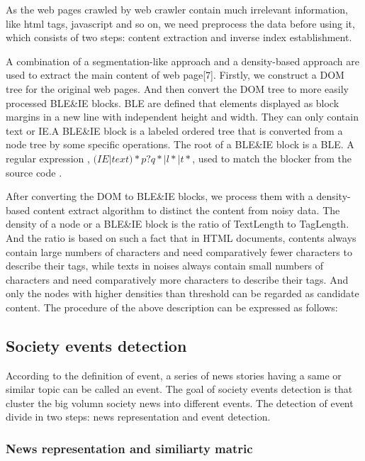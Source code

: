 \documentclass[conference]{IEEEtran}
\begin{document}
As the web pages crawled by web crawler contain much irrelevant information, like html tags, javascript and so on, we need preprocess the data before using it, which consists of two steps: content extraction and inverse index establishment.

A combination of a segmentation-like approach and a density-based approach  are used to extract the main content  of web page[7]. Firstly, we construct a DOM tree for the original web pages. And then convert the DOM tree to more easily processed BLE\&IE blocks. BLE are defined that elements displayed as block margins in a new line with independent height and width. They can only contain text or IE.A BLE\&IE block is a labeled ordered tree that is converted from a node tree by some specific operations. The root of a BLE\&IE block is a BLE. A regular expression , $(IE|text)*p?q*|l*|t*$, used to match the blocker from the source code .

After converting the DOM to BLE\&IE blocks, we process them with a density-based content extract algorithm to distinct the content from noisy data. The density of a node or a BLE\&IE block is the ratio of TextLength to TagLength. And the ratio is based on such a fact that in HTML documents, contents always contain large numbers of characters and need comparatively fewer characters to describe their tags, while texts in noises always contain small numbers of characters and need comparatively more characters to describe their tags. And only the nodes with higher densities than threshold can be regarded as candidate content. The procedure of the above description can be expressed as follows:
\begin{algorithm}
\end{algorithm}

\subsection{Society events detection}
According to the definition of event, a series of news stories having a same or similar topic can be called an event. 
The goal of society events detection is that cluster the big volumn society news into different events.  The detection of event divide in two steps: news representation and event detection.

\subsubsection{News representation and similiarty matric}
\end{document}
